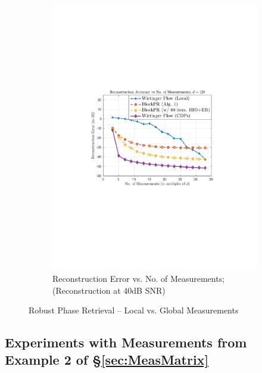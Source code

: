 \begin{figure}[hbtp]
\begin{subfigure}[b]{0.8\textwidth}
\centering
\includegraphics[trim = 1.5in 3.5in 1.5in 3.25in,scale=0.8]{pics/fig2b}
\caption{Reconstruction Error vs. No. of Measurements; (Reconstruction at $40$dB SNR)}
\label{fig:WF_meas}
\end{subfigure}
\caption{Robust Phase Retrieval -- Local vs. Global Measurements}
\label{fig:WF}
\end{figure}
%


\subsection{Experiments with Measurements from Example 2 of \S \ref{sec:MeasMatrix}}
\label{sec:SparseMeasureMasks}

